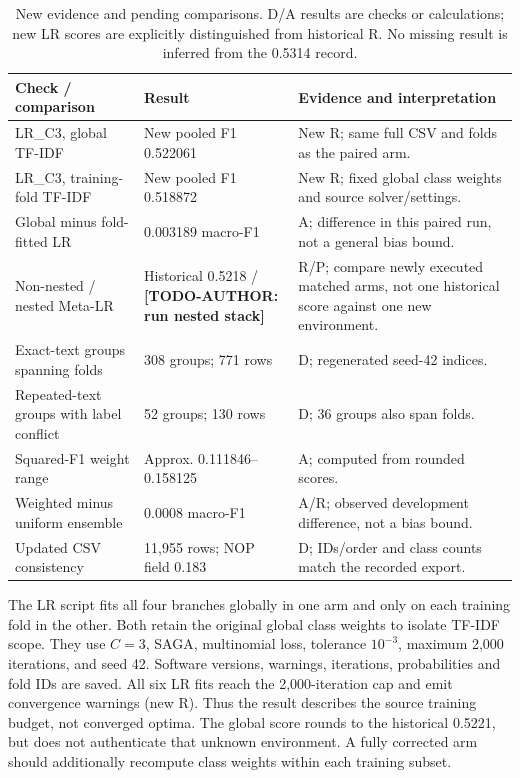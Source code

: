 \documentclass[doublecolumn]{ijcvsplatex}
\newcommand{\AuthorTodo}[1]{\textbf{[TODO-AUTHOR:\allowbreak{} #1]}}
\begin{document}
\begin{table}[t]
\small\centering
\caption{New evidence and pending comparisons. D/A results are checks or calculations; new LR scores are explicitly distinguished from historical R. No missing result is inferred from the 0.5314 record.}
\label{tab:newchecks}
\begin{tabularx}{\textwidth}{P{5cm}P{4cm}X}
\toprule
Check / comparison & Result & Evidence and interpretation \\
\midrule
LR\_C3, global TF-IDF & New pooled F1 0.522061 & New R; same full CSV and folds as the paired arm. \\
LR\_C3, training-fold TF-IDF & New pooled F1 0.518872 & New R; fixed global class weights and source solver/settings. \\
Global minus fold-fitted LR & 0.003189 macro-F1 & A; difference in this paired run, not a general bias bound. \\
Non-nested / nested Meta-LR & Historical 0.5218 / \AuthorTodo{run nested stack} & R/P; compare newly executed matched arms, not one historical score against one new environment. \\
Exact-text groups spanning folds & 308 groups; 771 rows & D; regenerated seed-42 indices. \\
Repeated-text groups with label conflict & 52 groups; 130 rows & D; 36 groups also span folds. \\
Squared-F1 weight range & Approx. 0.111846--0.158125 & A; computed from rounded scores. \\
Weighted minus uniform ensemble & 0.0008 macro-F1 & A/R; observed development difference, not a bias bound. \\
Updated CSV consistency & 11,955 rows; NOP field 0.183 & D; IDs/order and class counts match the recorded export. \\
\bottomrule
\end{tabularx}
\end{table}

The LR script fits all four branches globally in one arm and only on each training fold in the other. Both retain the original global class weights to isolate TF-IDF scope. They use $C=3$, SAGA, multinomial loss, tolerance $10^{-3}$, maximum 2,000 iterations, and seed 42. Software versions, warnings, iterations, probabilities and fold IDs are saved. All six LR fits reach the 2,000-iteration cap and emit convergence warnings (new R). Thus the result describes the source training budget, not converged optima. The global score rounds to the historical 0.5221, but does not authenticate that unknown environment. A fully corrected arm should additionally recompute class weights within each training subset.
\end{document}

